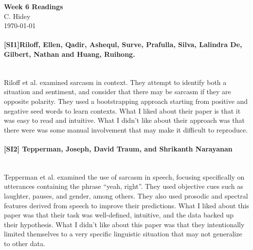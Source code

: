 \documentclass[12pt]{article}
\begin{document}
\begin{center}
  \textbf{Week 6 Readings} \\
  C. Hidey \\
  \today
\end{center}

\paragraph{{\bf [SI1]Riloff, Ellen, Qadir, Ashequl, Surve, Prafulla, Silva, Lalindra De, Gilbert, Nathan and Huang, Ruihong.}}
\text{} \\
Riloff et al. examined sarcasm in context.  They attempt to identify both a situation and sentiment, and consider that there may be sarcasm if they are opposite polarity.  They used a bootstrapping approach starting from positive and negative seed words to learn contexts.  What I liked about their paper is that it was easy to read and intuitive. What I didn't like about their approach was that there were was some manual involvement that may make it difficult to reproduce.

\paragraph{{\bf [SI2] Tepperman, Joseph, David Traum, and Shrikanth Narayanan}}
\text{} \\
Tepperman et al. examined the use of sarcasm in speech, focusing specifically on utterances containing the phrase ``yeah, right''.  They used objective cues such as laughter, 
pauses, and gender, among others.  They also used prosodic and spectral features derived from speech to improve their predictions.  What I liked about this paper was that their task was well-defined, intuitive, and the data backed up their hypothesis.  What I didn't like about this paper was that they intentionally limited themselves to a very specific linguistic situation that may not generalize to other data.
\end{document}
